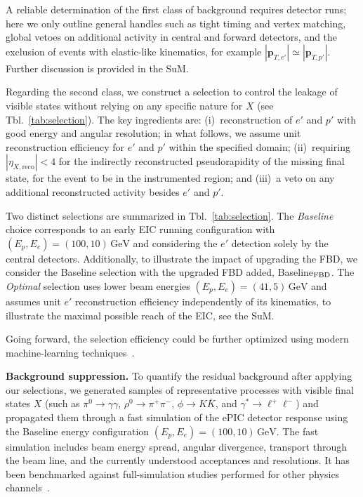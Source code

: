 \documentclass[aps,prd,preprintnumbers,superscriptaddress,nofootinbib,floatfix,twocolumn,notitlepage,reprint]{revtex4-2}
\newcommand{\GeV}{\mathrm{GeV}}
\begin{document}
A reliable determination of the first class of background requires detector runs; here we only outline general handles such as tight timing and vertex matching, global vetoes on additional activity in central and forward detectors, and the exclusion of events with elastic-like kinematics, for example $|\mathbf p_{T,e'}| \simeq |\mathbf p_{T,p'}|$. 
Further discussion is provided in the SuM.

Regarding the second class, we construct a selection to control the leakage of visible states without relying on any specific nature for $X$ (see Tbl.~\ref{tab:selection}). 
The key ingredients are: 
(i)~reconstruction of $e'$ and $p'$ with good energy and angular resolution; in what follows, we assume unit reconstruction efficiency for $e'$ and $p'$ within the specified domain;
(ii)~requiring $|\eta_{X,\text{reco}}|<4$ for the indirectly reconstructed pseudorapidity of the missing final state, for the event to be in the instrumented region; 
and (iii)~a veto on any additional reconstructed activity besides $e'$ and $p'$. 

 
Two distinct selections are summarized in Tbl.~\ref{tab:selection}. 
The \emph{Baseline} choice corresponds to an early EIC running configuration with $(E_p,E_e)=(100,10)\,\GeV$ and considering the $e'$ detection solely by the central detectors. 
Additionally, to illustrate the impact of upgrading the FBD, we consider the Baseline selection with the upgraded FBD added, Baseline$_{\rm FBD}$. 
The \emph{Optimal} selection uses lower beam energies $(E_p,E_e)=(41,5)\,\GeV$ and assumes unit $e'$ reconstruction efficiency independently of its kinematics, to illustrate the maximal possible reach of the EIC, see the SuM.

Going forward, the selection efficiency could be further optimized using modern machine-learning techniques~\cite{Allaire:2023fgp,Araz:2024bom}.

\textbf{Background suppression.} 
To quantify the residual background after applying our selections, we generated samples of representative processes with visible final states $X$ (such as $\pi^0\to\gamma\gamma$, $\rho^0\to\pi^+\pi^-$, $\phi\to K\bar K$, and $\gamma^*\to\ell^+\ell^-$) and propagated them through a fast simulation of the ePIC detector response using the Baseline energy configuration $(E_p,E_e)=(100,10)\,\GeV$. The fast simulation includes beam energy spread, angular divergence, transport through the beam line, and the currently understood acceptances and resolutions. 
It has been benchmarked against full-simulation studies performed for other physics channels~\cite{PhysRevC.104.065205,dvcs2025}.
\end{document}
